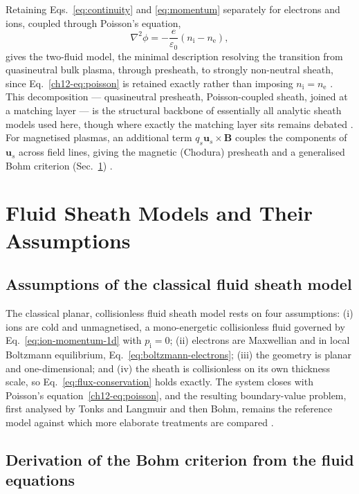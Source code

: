 Retaining Eqs.~\eqref{eq:continuity} and \eqref{eq:momentum} separately for electrons and ions, coupled through Poisson's equation,
\begin{equation}
\nabla^2\phi = -\frac{e}{\varepsilon_0}\left(n_{\mathrm{i}} - n_{\mathrm{e}}\right),
\label{ch12-eq:poisson}
\end{equation}
gives the two-fluid model, the minimal description resolving the transition from quasineutral bulk plasma, through presheath, to strongly non-neutral sheath, since Eq.~\eqref{ch12-eq:poisson} is retained exactly rather than imposing $n_{\mathrm{i}}=n_{\mathrm{e}}$ \cite{ref0023}. This decomposition — quasineutral presheath, Poisson-coupled sheath, joined at a matching layer — is the structural backbone of essentially all analytic sheath models used here, though where exactly the matching layer sits remains debated \cite{ref0015,ref0009}. For magnetised plasmas, an additional term $q_s\mathbf{u}_s\times\mathbf{B}$ couples the components of $\mathbf{u}_s$ across field lines, giving the magnetic (Chodura) presheath and a generalised Bohm criterion (Sec.~\ref{sec:sheath-models}) \cite{ref0017,ref0018}.

\section{Fluid Sheath Models and Their Assumptions}
\label{sec:sheath-models}

\subsection{Assumptions of the classical fluid sheath model}

The classical planar, collisionless fluid sheath model rests on four assumptions: (i) ions are cold and unmagnetised, a mono-energetic collisionless fluid governed by Eq.~\eqref{eq:ion-momentum-1d} with $p_{\mathrm{i}}=0$; (ii) electrons are Maxwellian and in local Boltzmann equilibrium, Eq.~\eqref{eq:boltzmann-electrons}; (iii) the geometry is planar and one-dimensional; and (iv) the sheath is collisionless on its own thickness scale, so Eq.~\eqref{eq:flux-conservation} holds exactly. The system closes with Poisson's equation~\eqref{ch12-eq:poisson}, and the resulting boundary-value problem, first analysed by Tonks and Langmuir and then Bohm, remains the reference model against which more elaborate treatments are compared \cite{ref0013}.

\subsection{Derivation of the Bohm criterion from the fluid equations}

